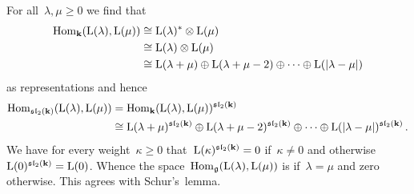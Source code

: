 \begin{example}
  For all~$\lambda, \mu \geq 0$ we find that
  \begin{align*}
    \operatorname{Hom}_{\mathbf{k}}( \operatorname{L}(\lambda), \operatorname{L}(\mu) )
    &\cong
    \operatorname{L}(\lambda)^* \otimes \operatorname{L}(\mu)
    \\
    &\cong
    \operatorname{L}(\lambda) \otimes \operatorname{L}(\mu)
    \\
    &\cong
            \operatorname{L}(\lambda+\mu)
    \oplus  \operatorname{L}(\lambda+\mu-2)
    \oplus  \dotsb
    \oplus  \operatorname{L}(\lvert\lambda-\mu\rvert)
  \end{align*}
  as representations and hence
  \begin{align*}
    \operatorname{Hom}_{\mathfrak{sl}_2(\mathbf{k})}( \operatorname{L}(\lambda), \operatorname{L}(\mu) )
    &=
    \operatorname{Hom}_{\mathbf{k}}( \operatorname{L}(\lambda), \operatorname{L}(\mu) )^{\mathfrak{sl}_2(\mathbf{k})}
    \\
    &\cong
            \operatorname{L}(\lambda+\mu)^{\mathfrak{sl}_2(\mathbf{k})}
    \oplus  \operatorname{L}(\lambda+\mu-2)^{\mathfrak{sl}_2(\mathbf{k})}
    \oplus  \dotsb
    \oplus  \operatorname{L}(\lvert\lambda-\mu\rvert)^{\mathfrak{sl}_2(\mathbf{k})} \,.
  \end{align*}
  We have for every weight~$\kappa \geq 0$ that~$\operatorname{L}(\kappa)^{\mathfrak{sl}_2(\mathbf{k})} = 0$ if~$\kappa \neq 0$ and otherwise~$\operatorname{L}(0)^{\mathfrak{sl}_2(\mathbf{k})} = \operatorname{L}(0)$.
  Whence the space~$\operatorname{Hom}_{\mathfrak{g}}( \operatorname{L}(\lambda), \operatorname{L}(\mu) )$ is {\onedimensional} if~$\lambda = \mu$ and zero otherwise.
  This agrees with Schur’s~lemma.
\end{example}




